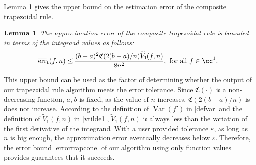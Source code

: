 \documentclass{iitthesis}
\DeclareMathOperator{\Var}{Var}
\newtheorem{lem}{Lemma}
\theoremstyle{definition}
\theoremstyle{remark}
\begin{document}
Lemma \ref{lemmaerrorboundtrap} gives the upper bound on the estimation error of the composite trapezoidal rule.
\begin{lem}\label{lemmaerrorboundtrap}
    The approximation error of the composite trapezoidal rule is bounded in terms of the integrand values as follows:
    \begin{equation}\label{errortrapcone}
      \overline{\textup{err}}_{\textup{t}}(f,n)\leq \frac{(b-a)^2\mathfrak{C}(2(b-a)/n)\widetilde{V}_1(f,n)}{8n^2}, \text{ for all } f \in \cc^1.
    \end{equation}
\end{lem}

This upper bound can be used as the factor of determining whether the output of our trapezoidal rule algorithm meets the error tolerance. Since $\mathfrak{C}(\cdot)$ is a non-decreasing function, $a$, $b$ is fixed, as the value of $n$ increases, $\mathfrak{C}(2(b-a)/n)$ is does not increase. According to the definition of $\Var(f')$ in \eqref{defvar} and the definition of $\widetilde{V}_1(f,n)$ in \eqref{vtilde1}, $\widetilde{V}_1(f,n)$ is always less than the variation of the first derivative of the integrand. With a user provided tolerance $\varepsilon$, as long as $n$ is big enough, the approximation error eventually decreases below $\varepsilon$. Therefore, the error bound \eqref{errortrapcone} of our algorithm using only function values provides guarantees that it succeeds.

\end{document}
